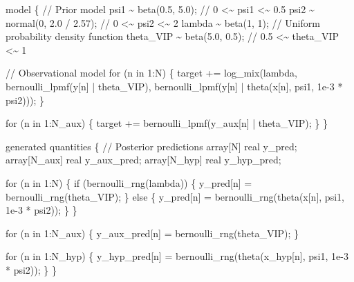 \documentclass[
  letterpaper,
  DIV=11,
  numbers=noendperiod]{scrartcl}
\newenvironment{Shaded}{\begin{snugshade}}{\end{snugshade}}
\newcommand{\CommentTok}[1]{\textcolor[rgb]{0.37,0.37,0.37}{#1}}
\newcommand{\ControlFlowTok}[1]{\textcolor[rgb]{0.00,0.23,0.31}{#1}}
\newcommand{\DataTypeTok}[1]{\textcolor[rgb]{0.68,0.00,0.00}{#1}}
\newcommand{\DecValTok}[1]{\textcolor[rgb]{0.68,0.00,0.00}{#1}}
\newcommand{\FloatTok}[1]{\textcolor[rgb]{0.68,0.00,0.00}{#1}}
\newcommand{\KeywordTok}[1]{\textcolor[rgb]{0.00,0.23,0.31}{#1}}
\newcommand{\NormalTok}[1]{\textcolor[rgb]{0.00,0.23,0.31}{#1}}
\begin{document}
\begin{codelisting}
\begin{Shaded}
\begin{Highlighting}[]
\KeywordTok{model}\NormalTok{ \{}
  \CommentTok{// Prior model}
\NormalTok{  psi1 \textasciitilde{} beta(}\FloatTok{0.5}\NormalTok{, }\FloatTok{5.0}\NormalTok{);        }\CommentTok{// 0   \textless{}\textasciitilde{}    psi1   \textless{}\textasciitilde{} 0.5}
\NormalTok{  psi2 \textasciitilde{} normal(}\DecValTok{0}\NormalTok{, }\FloatTok{2.0}\NormalTok{ / }\FloatTok{2.57}\NormalTok{); }\CommentTok{// 0   \textless{}\textasciitilde{}    psi2   \textless{}\textasciitilde{} 2}
\NormalTok{  lambda \textasciitilde{} beta(}\DecValTok{1}\NormalTok{, }\DecValTok{1}\NormalTok{);          }\CommentTok{// Uniform probability density function}
\NormalTok{  theta\_VIP \textasciitilde{} beta(}\FloatTok{5.0}\NormalTok{, }\FloatTok{0.5}\NormalTok{);   }\CommentTok{// 0.5 \textless{}\textasciitilde{} theta\_VIP \textless{}\textasciitilde{} 1}

  \CommentTok{// Observational model}
  \ControlFlowTok{for}\NormalTok{ (n }\ControlFlowTok{in} \DecValTok{1}\NormalTok{:N) \{}
    \KeywordTok{target +=}\NormalTok{ log\_mix(lambda,}
\NormalTok{                      bernoulli\_lpmf(y[n] | theta\_VIP),}
\NormalTok{                      bernoulli\_lpmf(y[n] | theta(x[n], psi1, }\FloatTok{1e{-}3}\NormalTok{ * psi2)));}
\NormalTok{  \}}

  \ControlFlowTok{for}\NormalTok{ (n }\ControlFlowTok{in} \DecValTok{1}\NormalTok{:N\_aux) \{}
    \KeywordTok{target +=}\NormalTok{ bernoulli\_lpmf(y\_aux[n] | theta\_VIP);}
\NormalTok{  \}}
\NormalTok{\}}

\KeywordTok{generated quantities}\NormalTok{ \{}
  \CommentTok{// Posterior predictions}
  \DataTypeTok{array}\NormalTok{[N] }\DataTypeTok{real}\NormalTok{ y\_pred;}
  \DataTypeTok{array}\NormalTok{[N\_aux] }\DataTypeTok{real}\NormalTok{ y\_aux\_pred;}
  \DataTypeTok{array}\NormalTok{[N\_hyp] }\DataTypeTok{real}\NormalTok{ y\_hyp\_pred;}

  \ControlFlowTok{for}\NormalTok{ (n }\ControlFlowTok{in} \DecValTok{1}\NormalTok{:N) \{}
    \ControlFlowTok{if}\NormalTok{ (bernoulli\_rng(lambda)) \{}
\NormalTok{      y\_pred[n] = bernoulli\_rng(theta\_VIP);}
\NormalTok{    \} }\ControlFlowTok{else}\NormalTok{ \{}
\NormalTok{      y\_pred[n] = bernoulli\_rng(theta(x[n], psi1, }\FloatTok{1e{-}3}\NormalTok{ * psi2));}
\NormalTok{    \}}
\NormalTok{  \}}

  \ControlFlowTok{for}\NormalTok{ (n }\ControlFlowTok{in} \DecValTok{1}\NormalTok{:N\_aux) \{}
\NormalTok{    y\_aux\_pred[n] = bernoulli\_rng(theta\_VIP);}
\NormalTok{  \}}

  \ControlFlowTok{for}\NormalTok{ (n }\ControlFlowTok{in} \DecValTok{1}\NormalTok{:N\_hyp) \{}
\NormalTok{    y\_hyp\_pred[n] = bernoulli\_rng(theta(x\_hyp[n], psi1, }\FloatTok{1e{-}3}\NormalTok{ * psi2));}
\NormalTok{  \}}
\NormalTok{\}}
\end{Highlighting}
\end{Shaded}

\end{codelisting}
\end{document}
